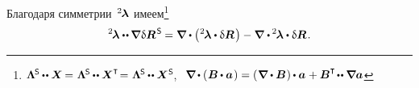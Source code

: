 \begin{otherlanguage}{russian}
\vspace{-0.16em} Благодаря симметрии~${^2\hspace{-0.2ex}\bm{\lambda}}$ имеем\footnote{${%
\bm{\Lambda}^{\hspace{-0.16ex}\mathsf{S}} \hspace{-0.1ex} \dotdotp \bm{X} \hspace{-0.2ex} =
\hspace{0.1ex} \bm{\Lambda}^{\hspace{-0.16ex}\mathsf{S}} \hspace{-0.1ex} \dotdotp \bm{X}^{\T} \hspace{-0.4ex} =
\hspace{0.1ex} \bm{\Lambda}^{\hspace{-0.16ex}\mathsf{S}} \hspace{-0.1ex} \dotdotp \bm{X}^{\hspace{0.08ex}\mathsf{S}}
\hspace{-0.25ex}}$, ${\hspace{0.4em}
\boldnabla \hspace{-0.1ex} \dotp \left( \hspace{0.1ex} {\bm{B}} \hspace{-0.1ex} \dotp \bm{a} \hspace{0.16ex} \right) = \left( \hspace{0.1ex} \boldnabla \dotp \bm{B} \hspace{0.1ex} \right) \hspace{-0.1ex} \dotp \bm{a} \hspace{0.1ex} + \bm{B}^{\T} \hspace{-0.25ex} \dotdotp \boldnabla \bm{a}
}$}
\nopagebreak\vspace{.1em}\begin{equation*}
{^2\hspace{-0.2ex}\bm{\lambda}} \dotdotp \hspace{-0.1ex} \boldnabla \hspace{0.1ex} \variation{\bm{R}}^{\hspace{0.2ex}\mathsf{S}} \hspace{-0.1ex} =
\boldnabla^{\mathstrut} \hspace{-0.1ex} \dotp \left( \hspace{0.1ex} {^2\hspace{-0.2ex}\bm{\lambda}} \dotp \variation{\bm{R}} \hspace{0.2ex} \right)
- \boldnabla \hspace{0.1ex} \dotp \hspace{-0.1ex} {^2\hspace{-0.2ex}\bm{\lambda}} \dotp \variation{\bm{R}} \hspace{0.2ex}.
\end{equation*}


\end{otherlanguage}
